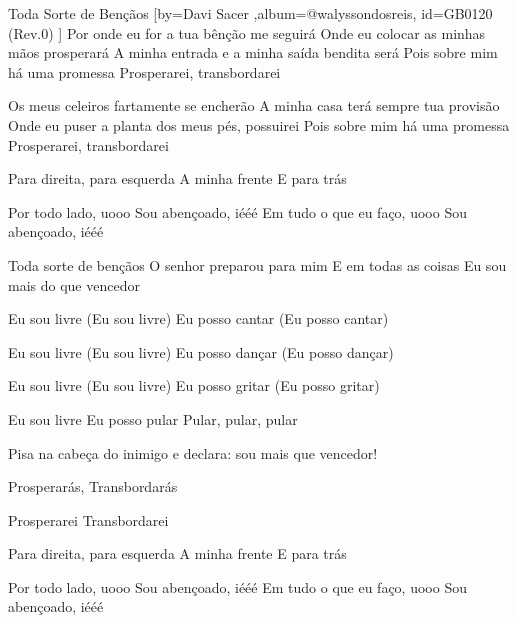 \beginsong
{Toda Sorte de Bençãos %
}[by={Davi Sacer %
},album={@walyssondosreis},
id={GB0120 %
(Rev.0) %
}]
Por onde eu for a tua bênção me seguirá
Onde eu colocar as minhas mãos prosperará
A minha entrada e a minha saída bendita será
Pois sobre mim há uma promessa
Prosperarei, transbordarei

Os meus celeiros fartamente se encherão
A minha casa terá sempre tua provisão
Onde eu puser a planta dos meus pés, possuirei
Pois sobre mim há uma promessa
Prosperarei, transbordarei

Para direita, para esquerda
A minha frente
E para trás

Por todo lado, uooo
Sou abençoado, iééé
Em tudo o que eu faço, uooo
Sou abençoado, iééé

Toda sorte de bençãos
O senhor preparou para mim
E em todas as coisas
Eu sou mais do que vencedor

Eu sou livre (Eu sou livre)
Eu posso cantar (Eu posso cantar)

Eu sou livre (Eu sou livre)
Eu posso dançar (Eu posso dançar)

Eu sou livre (Eu sou livre)
Eu posso gritar (Eu posso gritar)

Eu sou livre
Eu posso pular
Pular, pular, pular

Pisa na cabeça do inimigo e declara:
sou mais que vencedor!

Prosperarás,
Transbordarás

Prosperarei
Transbordarei

Para direita, para esquerda
A minha frente
E para trás

Por todo lado, uooo
Sou abençoado, iééé
Em tudo o que eu faço, uooo
Sou abençoado, iééé



